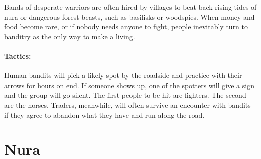 \begin{multicols}{2}
Bands of desperate warriors are often hired by villages to beat back rising tides of nura or dangerous forest beasts, such as basilisks or woodspies.
When money and food become rare, or if nobody needs anyone to fight, people inevitably turn to banditry as the only way to make a living.

\paragraph{Tactics:} Human bandits will pick a likely spot by the roadside and practice with their arrows for hours on end.
If someone shows up, one of the spotters will give a sign and the group will go silent.
The first people to be hit are fighters.
The second are the horses.
Traders, meanwhile, will often survive an encounter with bandits if they agree to abandon what they have and run along the road.



\vfill\null
\end{multicols}

\section{Nura}

